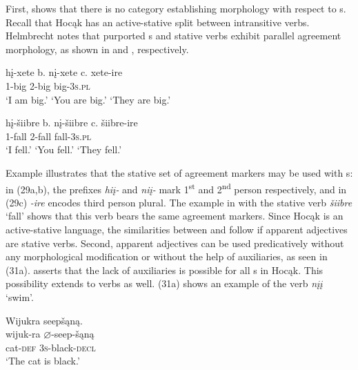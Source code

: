 \documentclass[output=paper]{LSP/langsci}
\begin{document}
First, \citet{Helmbrecht2006b} shows that there is no category establishing morphology with respect to s. Recall that Hocąk has an active-stative split between intransitive verbs. Helmbrecht notes that purported s and stative verbs exhibit parallel agreement morphology, as shown in  and , respectively.
 
\let\eachwordtwo=\upshape
 
\ea\label{ex:rosen:29}
\ea \gll
hį-xete \hspace{36pt} b. {}  nį-xete \hspace{48pt} c. {} xete-ire\\
1-big {} {} {} 2-big {} {}  {} big-\textsc{3s.pl}\\
\glt `I am big.' \hspace{1.2cm} `You are big.' \hspace{1.1cm} `They are big.'

\z
\z

\ea\label{ex:rosen:30}
\ea
\gll
hį-šiibre \hspace{30pt}  b. {} nį-šiibre \hspace{43pt} c. {} šiibre-ire\\
1-fall {} {} {} 2-fall {} {} {} fall-\textsc{3s.pl}\\
\glt `I fell.' \hspace{1.8cm} `You fell.'  \hspace{1.8cm} `They fell.'
\z
\z

 
Example  illustrates that the stative set of agreement markers may be used with s: in (29a,b), the prefixes \textit{hiį-} and \textit{niį-} mark 1\textsuperscript{st} and 2\textsuperscript{nd} person respectively, and in (29c) \textit{-ire} encodes third person plural. The example in  with the stative verb \textit{šiibre} `fall' shows that this verb bears the same agreement markers. Since Hocąk is an active-stative language, the similarities between  and  follow if apparent adjectives are stative verbs. Second, apparent adjectives can be used predicatively without any morphological modification or without the help of auxiliaries, as seen in (31a). \citet{Helmbrecht2006b} asserts that the lack of auxiliaries is possible for all s in Hocąk. This possibility extends to verbs as well. (31a) shows an example of the verb \textit{nįį} `swim'.
 

\ea
\label{ex:rosen:31}
\ea \glll Wijukra seepšąną. \\
wijuk-ra {$\varnothing$}-seep-šąną\\
cat-\textsc{def} \textsc{3s}-black-\textsc{decl}\\
\glt `The cat is black.'
\end{document}
